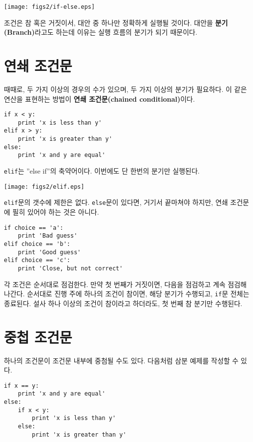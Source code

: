 \beforefig
\centerline{\texttt{[image: figs2/if-else.eps]}}
\afterfig

조건은 참 혹은 거짓이서, 대안 중 하나만 정확하게 실행될 것이다. 대안을 {\bf 분기(Branch)}라고도 하는데 이유는 실행 흐름의 분기가 되기 때문이다.


\section{연쇄 조건문}
때때로, 두 가지 이상의 경우의 수가 있으며, 두 가지 이상의 분기가 필요하다.
이 같은 연산을 표현하는 방법이 {\bf 연쇄 조건문(chained conditional)}이다.

\beforeverb
\begin{verbatim}
if x < y:
    print 'x is less than y'
elif x > y:
    print 'x is greater than y'
else:
    print 'x and y are equal'
\end{verbatim}
\afterverb
%
{\tt elif}는 ''else if''의 축약어이다. 이번에도 단 한번의 분기만 실행된다.

\beforefig
\centerline{\texttt{[image: figs2/elif.eps]}}
\afterfig

{\tt elif}문의 갯수에 제한은 없다. {\tt else}문이 있다면, 거기서 끝마쳐야 하지만, 연쇄 조건문에 필히 있어야 하는 것은 아니다.



\beforeverb
\begin{verbatim}
if choice == 'a':
    print 'Bad guess'
elif choice == 'b':
    print 'Good guess'
elif choice == 'c':
    print 'Close, but not correct'
\end{verbatim}
\afterverb
%
각 조건은 순서대로 점검한다. 만약 첫 번째가 거짓이면, 다음을 점검하고 계속 점검해 나간다.
순서대로 진행 주에 하나의 조건이 참이면, 해당 분기가 수행되고, {\tt if}문 전체는 종료된다. 
설사 하나 이상의 조건이 참이라고 하더라도, 첫 번째 참 분기만 수행된다.


\section{중첩 조건문}

하나의 조건문이 조건문 내부에 중첨될 수도 있다. 
다음처럼 삼분 예제를 작성할 수 있다.

\beforeverb
\begin{verbatim}
if x == y:
    print 'x and y are equal'
else:
    if x < y:
        print 'x is less than y'
    else:
        print 'x is greater than y'
\end{verbatim}
\afterverb
%

